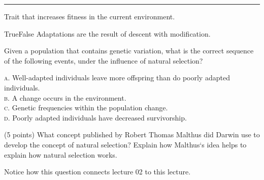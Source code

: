 \documentclass[letterpaper]{tufte-handout}
\begin{document}
\noindent \rule{1in}{0.4pt} Trait that increases fitness in the current environment.

\bigskip

\noindent True\hspace{1em}False\hspace{1em} Adaptations are the result of descent with modification. 

\bigskip

\noindent Given a population that contains genetic variation, what is the correct sequence of the following events, under the influence of natural selection?

\smallskip

\noindent \textsc{a}. Well-adapted individuals leave more offspring than do poorly adapted individuals.\\
\noindent \textsc{b}. A change occurs in the environment.\\
\noindent \textsc{c}. Genetic frequencies within the population change.\\
\noindent \textsc{d}. Poorly adapted individuals have decreased survivorship.\\

\bigskip

\noindent (5 points) What concept published by Robert Thomas Malthus did Darwin use to develop the concept of natural selection? Explain how Malthus‘s idea helps to explain how natural selection works.

\smallskip

Notice how this question connects lecture 02 to this lecture.
\end{document}
